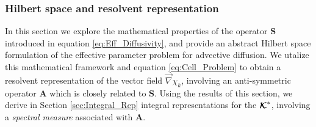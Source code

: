 \documentclass[11pt]{amsart}
\newcommand{\Sb}{\mathbf{S}}
\newcommand{\Ab}{\mathbf{A}}
\newcommand\Kbc{\mbox{\boldmath${\mathcal{K}}$}}
\begin{document}
\subsubsection{Hilbert space and resolvent
  representation} \label{sec:Hilbert_Space}   
%
In this section we explore the mathematical properties of the operator
$\Sb$ introduced in equation \eqref{eq:Eff_Diffusivity}, and provide
an abstract Hilbert space formulation of the effective parameter
problem for advective diffusion. We utalize this mathematical
framework and equation \eqref{eq:Cell_Problem}  to obtain a resolvent
representation of the vector field $\vec{\nabla}\chi_k$, involving an
anti-symmetric operator $\Ab$ which is closely related to $\Sb$. Using
the results of this section, we derive in Section
\ref{sec:Integral_Rep} integral representations for the $\Kbc^*$,
involving a \emph{spectral measure} associated with $\Ab$.      
\end{document}
